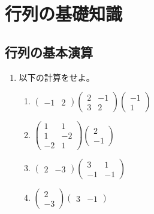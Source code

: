 \documentclass[twocolumn,11pt]{jarticle}
\begin{document}
\section{行列の基礎知識}

\subsection{行列の基本演算}

\begin{enumerate}
\item 
以下の計算をせよ。
\begin{enumerate}
\item \qquad$
  \begin{pmatrix}
    -1 & 2
  \end{pmatrix}
      \begin{pmatrix}
        2 & -1 \\
        3 & 2
      \end{pmatrix}
      \begin{pmatrix}
        -1 \\
        1
      \end{pmatrix}
$
\item \qquad$
      \begin{pmatrix}
        1 & 1 \\
        1 & -2 \\
        -2 & 1
      \end{pmatrix}
      \begin{pmatrix}
        2 \\
        -1
      \end{pmatrix}
$
\item \qquad$
  \begin{pmatrix}
    2 & -3
  \end{pmatrix}
  \begin{pmatrix}
    3 & 1 \\
    -1 & -1
  \end{pmatrix}
$
\item \qquad$
  \begin{pmatrix}
    2 \\ -3
  \end{pmatrix}
  \begin{pmatrix}
    3 & -1
  \end{pmatrix}
$
\end{enumerate}


\end{enumerate}
\end{document}
